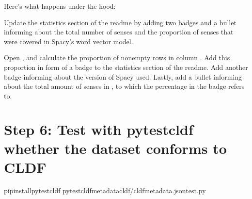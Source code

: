 \documentclass[letterpaper,10pt,english]{sphinxmanual}
\begin{document}
{{{{\sphinxAtStartPar
Here’s what happens under the hood:

\label{\detokenize{mkcldf:module-gerstnerhungariancommands.update_readme}}
\sphinxAtStartPar
Update the statistics section of the readme by adding two badges and a bullet
informing about the total number of senses and the proportion of senses that
were covered in Spacy’s word vector model.

\begin{fulllineitems}
\label{\detokenize{mkcldf:gerstnerhungariancommands.update_readme.run}}
\pysigstartsignatures
{}
\pysigstopsignatures
\sphinxAtStartPar
Open , and calculate the proportion of non\sphinxhyphen{}empty rows
in column . Add this proportion in form of a badge to the
statistics section of the readme. Add another badge informing about the
version of Spacy used. Lastly, add a bullet informing about the total
amount of senses in , to which the percentage in the
badge refers to.

\end{fulllineitems}



\section{Step 6: Test with pytest\sphinxhyphen{}cldf whether the dataset conforms to CLDF}
\label{\detokenize{mkcldf:step-6-test-with-pytest-cldf-whether-the-dataset-conforms-to-cldf}}
\begin{sphinxVerbatim}[commandchars=\\\{\}]
pipinstallpytest\PYGZhy{}cldf
pytest\PYGZhy{}\PYGZhy{}cldf\PYGZhy{}metadatacldf/cldf\PYGZhy{}metadata.jsontest.py
\end{sphinxVerbatim}

}}}}
\end{document}
